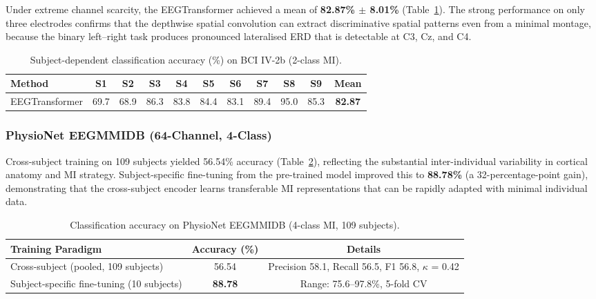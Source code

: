 \documentclass[12pt, a4paper]{article}
\begin{document}
Under extreme channel scarcity, the EEGTransformer achieved a mean of \textbf{82.87\% $\pm$ 8.01\%} (Table~\ref{tab:iv2b_results}). The strong performance on only three electrodes confirms that the depthwise spatial convolution can extract discriminative spatial patterns even from a minimal montage, because the binary left--right task produces pronounced lateralised ERD that is detectable at C3, Cz, and C4.

\begin{table}[htbp]
\centering
\caption{Subject-dependent classification accuracy (\%) on BCI IV-2b (2-class MI).}
\label{tab:iv2b_results}
\begin{tabular}{lcccccccccc}
\toprule
\textbf{Method} & \textbf{S1} & \textbf{S2} & \textbf{S3} & \textbf{S4} & \textbf{S5} & \textbf{S6} & \textbf{S7} & \textbf{S8} & \textbf{S9} & \textbf{Mean} \\
\midrule
EEGTransformer & 69.7 & 68.9 & 86.3 & 83.8 & 84.4 & 83.1 & 89.4 & 95.0 & 85.3 & \textbf{82.87} \\
\bottomrule
\end{tabular}
\end{table}

\subsubsection{PhysioNet EEGMMIDB (64-Channel, 4-Class)}

Cross-subject training on 109 subjects yielded 56.54\% accuracy (Table~\ref{tab:physionet_results}), reflecting the substantial inter-individual variability in cortical anatomy and MI strategy. Subject-specific fine-tuning from the pre-trained model improved this to \textbf{88.78\%} (a 32-percentage-point gain), demonstrating that the cross-subject encoder learns transferable MI representations that can be rapidly adapted with minimal individual data.

\begin{table}[htbp]
\centering
\caption{Classification accuracy on PhysioNet EEGMMIDB (4-class MI, 109 subjects).}
\label{tab:physionet_results}
\begin{tabular}{lcc}
\toprule
\textbf{Training Paradigm} & \textbf{Accuracy (\%)} & \textbf{Details} \\
\midrule
Cross-subject (pooled, 109 subjects) & 56.54 & Precision 58.1, Recall 56.5, F1 56.8, $\kappa$ = 0.42 \\
Subject-specific fine-tuning (10 subjects) & \textbf{88.78} & Range: 75.6--97.8\%, 5-fold CV \\
\bottomrule
\end{tabular}
\end{table}
\end{document}
